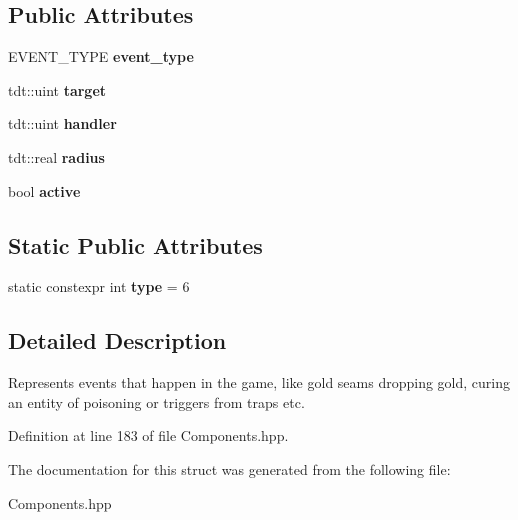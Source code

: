 \subsection*{Public Attributes}
\begin{DoxyCompactItemize}
\item 
E\+V\+E\+N\+T\+\_\+\+T\+Y\+PE {\bfseries event\+\_\+type}\hypertarget{struct_event_component_a258be4826d7efeb3360970b789021c1a}{}\label{struct_event_component_a258be4826d7efeb3360970b789021c1a}

\item 
tdt\+::uint {\bfseries target}\hypertarget{struct_event_component_a1b12eccc9e2bf6132c28a1ba82195a0e}{}\label{struct_event_component_a1b12eccc9e2bf6132c28a1ba82195a0e}

\item 
tdt\+::uint {\bfseries handler}\hypertarget{struct_event_component_a898fb8e2a56106c3eb9fc6bcf314fa16}{}\label{struct_event_component_a898fb8e2a56106c3eb9fc6bcf314fa16}

\item 
tdt\+::real {\bfseries radius}\hypertarget{struct_event_component_a72794d817ae4bd09be962fcb6f4e27e5}{}\label{struct_event_component_a72794d817ae4bd09be962fcb6f4e27e5}

\item 
bool {\bfseries active}\hypertarget{struct_event_component_ae06cba5bf30d9135ae435d0d69f338c3}{}\label{struct_event_component_ae06cba5bf30d9135ae435d0d69f338c3}

\end{DoxyCompactItemize}
\subsection*{Static Public Attributes}
\begin{DoxyCompactItemize}
\item 
static constexpr int {\bfseries type} = 6\hypertarget{struct_event_component_a4f1f827d5a5e38ee791850ffb8460d67}{}\label{struct_event_component_a4f1f827d5a5e38ee791850ffb8460d67}

\end{DoxyCompactItemize}


\subsection{Detailed Description}
Represents events that happen in the game, like gold seams dropping gold, curing an entity of poisoning or triggers from traps etc. 

Definition at line 183 of file Components.\+hpp.



The documentation for this struct was generated from the following file\+:\begin{DoxyCompactItemize}
\item 
Components.\+hpp\end{DoxyCompactItemize}
